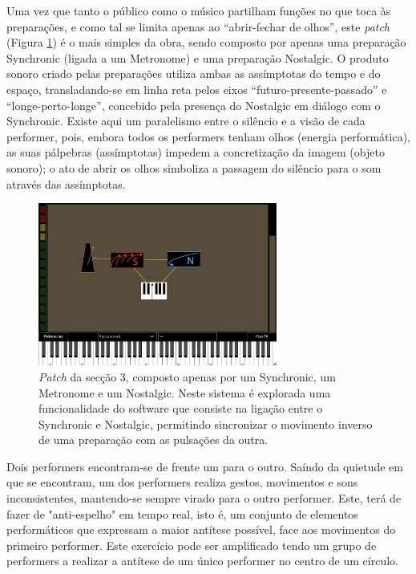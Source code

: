 \documentclass[../main.tex]{subfiles}
\begin{document}
Uma vez que tanto o público como o músico partilham funções no que toca às preparações, e como tal se limita apenas ao \enquote{abrir-fechar de olhos}, este \textsl{patch} (Figura \ref{fig:bit3}) é o mais simples da obra, sendo composto por apenas uma preparação Synchronic (ligada a um Metronome) e uma preparação Nostalgic. O produto sonoro criado pelas preparações utiliza ambas as assímptotas do tempo e do espaço, transladando-se em linha reta pelos eixos \enquote{futuro-presente-passado} e \enquote{longe-perto-longe}, concebido pela presença do Nostalgic em diálogo com o Synchronic. Existe aqui um paralelismo entre o silêncio e a visão de cada performer, pois, embora todos os performers tenham olhos (energia performática), as suas pálpebras (assímptotas) impedem a concretização da imagem (objeto sonoro); o ato de abrir os olhos simboliza a passagem do silêncio para o som através das assímptotas.

\begin{figure}[h]
    \centering
    \captionsetup{width=0.8\textwidth}
    \includegraphics[width=0.7\textwidth]{images/bit3.png}
    \caption{\textsl{Patch} da secção 3, composto apenas por um Synchronic, um Metronome e um Nostalgic. Neste sistema é explorada uma funcionalidade do software que consiste na ligação entre o Synchronic e Nostalgic, permitindo sincronizar o movimento inverso de uma preparação com as pulsações da outra.}
    \label{fig:bit3}
\end{figure}

\begin{performex}
    Dois performers encontram-se de frente um para o outro. Saíndo da quietude em que se encontram, um dos performers realiza gestos, movimentos e sons inconsistentes, mantendo-se sempre virado para o outro performer. Este, terá de fazer de "anti-espelho" em tempo real, isto é, um conjunto de elementos performáticos que expressam a maior antítese possível, face aos movimentos do primeiro performer. Este exercício pode ser amplificado tendo um grupo de performers a realizar a antítese de um único performer no centro de um círculo.
\end{performex}
\end{document}
